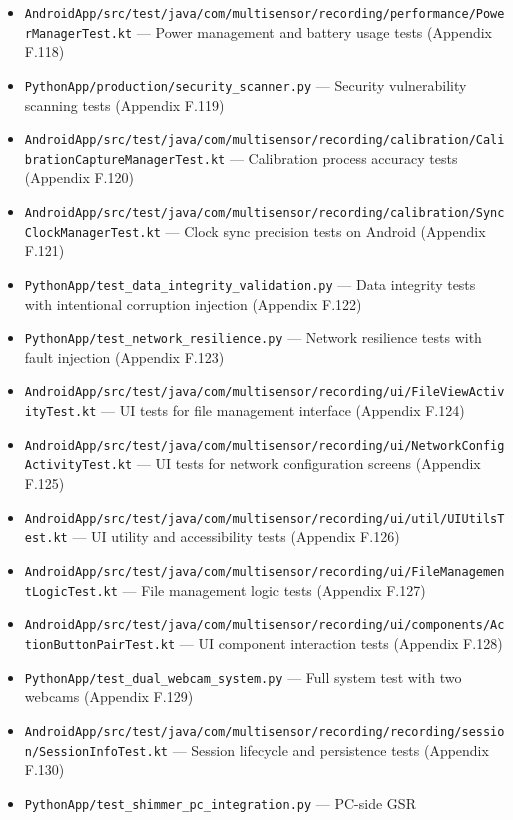 {{{{{{{{{{{{{{\begin{itemize}
--- Network performance tests under different conditions (Appendix F.117)
\item
\texttt{AndroidApp/src/test/java/com/multisensor/recording/performance/PowerManagerTest.kt}
--- Power management and battery usage tests (Appendix F.118)
\item \texttt{PythonApp/production/security\_scanner.py} --- Security
vulnerability scanning tests (Appendix F.119)
\item
\texttt{AndroidApp/src/test/java/com/multisensor/recording/calibration/CalibrationCaptureManagerTest.kt}
--- Calibration process accuracy tests (Appendix F.120)
\item
\texttt{AndroidApp/src/test/java/com/multisensor/recording/calibration/SyncClockManagerTest.kt}
--- Clock sync precision tests on Android (Appendix F.121)
\item \texttt{PythonApp/test\_data\_integrity\_validation.py} --- Data integrity
tests with intentional corruption injection (Appendix F.122)
\item \texttt{PythonApp/test\_network\_resilience.py} --- Network resilience
tests with fault injection (Appendix F.123)
\item
\texttt{AndroidApp/src/test/java/com/multisensor/recording/ui/FileViewActivityTest.kt}
--- UI tests for file management interface (Appendix F.124)
\item
\texttt{AndroidApp/src/test/java/com/multisensor/recording/ui/NetworkConfigActivityTest.kt}
--- UI tests for network configuration screens (Appendix F.125)
\item
\texttt{AndroidApp/src/test/java/com/multisensor/recording/ui/util/UIUtilsTest.kt}
--- UI utility and accessibility tests (Appendix F.126)
\item
\texttt{AndroidApp/src/test/java/com/multisensor/recording/ui/FileManagementLogicTest.kt}
--- File management logic tests (Appendix F.127)
\item
\texttt{AndroidApp/src/test/java/com/multisensor/recording/ui/components/ActionButtonPairTest.kt}
--- UI component interaction tests (Appendix F.128)
\item \texttt{PythonApp/test\_dual\_webcam\_system.py} --- Full system test with
two webcams (Appendix F.129)
\item
\texttt{AndroidApp/src/test/java/com/multisensor/recording/recording/session/SessionInfoTest.kt}
--- Session lifecycle and persistence tests (Appendix F.130)
\item \texttt{PythonApp/test\_shimmer\_pc\_integration.py} --- PC-side GSR

\end{itemize}}}}}}}}}}}}}}}
